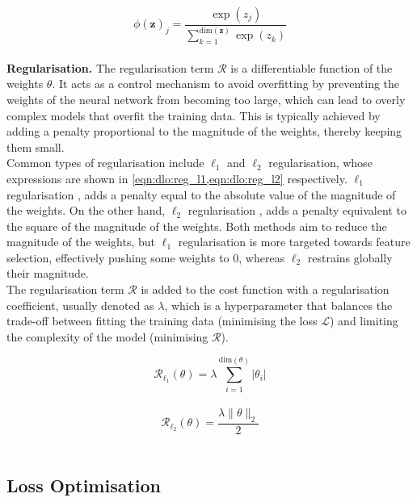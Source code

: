 \begin{equation}
  \label{eqn:dlo:softmax}
  \phi(\mathbf{z})_j = \frac{\exp(z_j)}{\displaystyle\sum_{k=1}^{\text{dim}(\mathbf{z})} \exp(z_k)}
\end{equation}\\

\noindent \textbf{Regularisation.} The regularisation term $\mathcal{R}$ is a
differentiable function of the weights $\theta$. It acts as a control mechanism
to avoid overfitting by preventing the weights of the neural network from
becoming too large, which can lead to overly complex models that overfit the
training data. This is typically achieved by adding a penalty proportional to
the magnitude of the weights, thereby keeping them small.\\

Common types of regularisation include $\ell_1$ and $\ell_2$ regularisation,
whose expressions are shown in \cref{eqn:dlo:reg_l1,eqn:dlo:reg_l2}
respectively. $\ell_1$ regularisation \cite{tibshirani1996regression}, adds a
penalty equal to the absolute value of the magnitude of the weights. On the
other hand, $\ell_2$ regularisation \cite{hoerl1970ridge}, adds a penalty
equivalent to the square of the magnitude of the weights. Both methods aim to
reduce the magnitude of the weights, but $\ell_1$ regularisation is more
targeted towards feature selection, effectively pushing some weights to $0$,
whereas $\ell_2$ restrains globally their magnitude.\\

The regularisation term $\mathcal{R}$ is added to the cost function with a
regularisation coefficient, usually denoted as $\lambda$, which is a
hyperparameter that balances the trade-off between fitting the training data
(minimising the loss $\mathcal{L}$) and limiting the complexity of the model
(minimising $\mathcal{R}$).

\begin{equation}
  \label{eqn:dlo:reg_l1}
  \mathcal{R}_{\ell_1}(\theta) = \lambda \sum_{i=1}^{\text{dim}(\theta)} \left| \theta_i \right|
\end{equation}\\

\begin{equation}
  \label{eqn:dlo:reg_l2}
  \mathcal{R}_{\ell_2}(\theta) = \frac{\lambda \| \theta \|_2}{2} 
\end{equation}\\

\subsection{Loss Optimisation}\label{sec:dlo:backpropagation}

